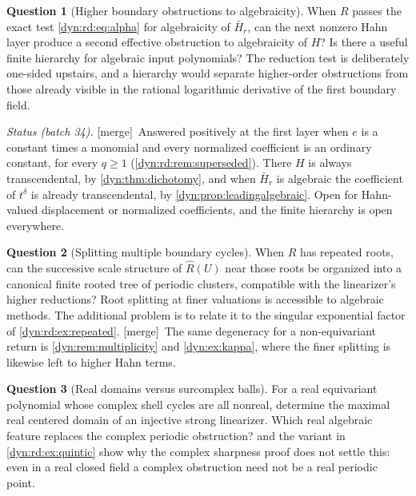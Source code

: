 \documentclass[11pt,letterpaper]{article}
\theoremstyle{definition}
\newtheorem{question}[question]{Question}
\theoremstyle{remark}
\newcommand{\mergetag}{\textup{\textsf{\small[merge]}}}%
\numberwithin{equation}{section}
\begin{document}
\begin{question}[Higher boundary obstructions to algebraicity]
\label{dyn:rd:q:higher}
When $R$ passes the exact test \eqref{dyn:rd:eq:alpha} for algebraicity of
$\bar H_r$, can the next nonzero Hahn layer produce a second effective
obstruction to algebraicity of $H$? Is there a useful finite hierarchy for
algebraic input polynomials? The reduction test is deliberately one-sided
upstairs, and a hierarchy would separate higher-order obstructions from
those already visible in the rational logarithmic derivative of the first
boundary field.

\emph{Status (batch 34).} \mergetag\ Answered positively at the first
layer when $e$ is a constant times a monomial and every normalized
coefficient is an ordinary constant, for every $q\ge1$
(\cref{dyn:rd:rem:superseded}). There $H$ is always transcendental, by
\cref{dyn:thm:dichotomy}, and when $\bar H_r$ is algebraic the coefficient
of $t^{\delta}$ is already transcendental, by
\cref{dyn:prop:leadingalgebraic}. Open for Hahn-valued displacement or
normalized coefficients, and the finite hierarchy is open everywhere.
\end{question}

\begin{question}[Splitting multiple boundary cycles]
\label{dyn:rd:q:splitting}
When $R$ has repeated roots, can the successive scale structure of
$\widehat R(U)$ near those roots be organized into a canonical finite rooted
tree of periodic clusters, compatible with the linearizer's higher
reductions? Root splitting at finer valuations is accessible to algebraic
methods. The additional problem is to relate it to the singular exponential
factor of \cref{dyn:rd:ex:repeated}. \mergetag\ The same degeneracy for a
non-equivariant return is \cref{dyn:rem:multiplicity} and
\cref{dyn:ex:kappa}, where the finer splitting is likewise left to higher
Hahn terms.
\end{question}

\begin{question}[Real domains versus surcomplex balls]\label{dyn:rd:q:real}
For a real equivariant polynomial whose complex shell cycles are all
nonreal, determine the maximal real centered domain of an injective strong
linearizer. Which real algebraic feature replaces the complex periodic
obstruction?  and the variant in
\cref{dyn:rd:ex:quintic} show why the complex sharpness proof does not
settle this: even in a real closed field a complex obstruction need not be a
real periodic point.
\end{question}
\end{document}
